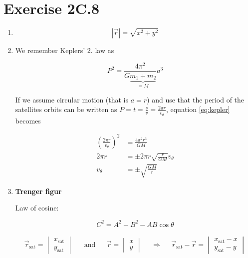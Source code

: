 \documentclass[a4paper,10pt,english]{article}
\begin{document}
\section*{Exercise 2C.8}

\begin{enumerate}

\item 

\[|\vec{r}|=\sqrt{x^{2}+y^{2}}\]

\item We remember Keplers' 2. law as 

\begin{equation}\label{eq:kepler}
P^{2}=\frac{4\pi^{2}}{G\underbrace{m_{1}+m_{2}}_{=M}}a^{3}
\end{equation}

If we assume circular motion (that is $a=r$) and use that the period of the satellites orbits can be written as $P=t=\frac{s}{v}=\frac{2\pi r}{v_{\theta}}$, equation \ref{eq:kepler} becomes

\begin{align*}
\left(\frac{2\pi r}{v_{\theta}}\right)^{2}&=\frac{4\pi^{2}r^{3}}{GM}\\
2\pi r&=\pm2\pi r\sqrt{\frac{r}{GM}}v_{\theta}\\
v_{\theta}&=\pm\sqrt{\frac{GM}{r}}
\end{align*}

\item \textbf{Trenger figur}

Law of cosine:

\begin{equation}
C^{2}=A^{2}+B^{2}-AB\cos{\theta}
\end{equation}

\begin{align*}
\vec{r}_{\text{sat}}=\begin{vmatrix}x_{\text{sat}}\\y_{\text{sat}}\end{vmatrix} &&\text{and}&& \vec{r}=\begin{vmatrix}x\\y\end{vmatrix} &&\Rightarrow&& \vec{r}_{\text{sat}}-\vec{r}=\begin{vmatrix}x_{\text{sat}}-x\\y_{\text{sat}}-y\end{vmatrix}
\end{align*}


\end{enumerate}
\end{document}
